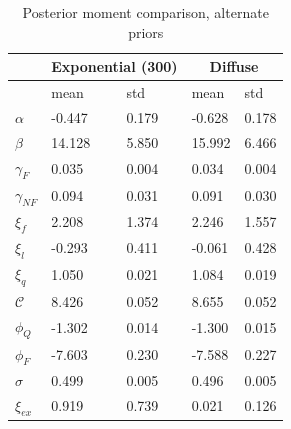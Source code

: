 \documentclass[]{article}
\begin{document}
\begin{table}[h!]
    \centering
    \begin{tabular}{|l|l|l|l|l|}
        \hline 
         & \multicolumn{2}{|c|}{Exponential (300)}        & \multicolumn{2}{|c|}{Diffuse} \\ \hline\hline
                            & mean    & std   & mean       & std    \\ \hline
         $\alpha$             & -0.447 & 0.179 & -0.628 & 0.178 \\ \hline
         $\beta$              & 14.128 & 5.850 & 15.992 & 6.466 \\ \hline
         $\gamma_{F}$         & 0.035  & 0.004 & 0.034  & 0.004 \\ \hline
         $\gamma_{NF}$        & 0.094  & 0.031 & 0.091  & 0.030 \\ \hline
         $\xi_f$              & 2.208  & 1.374 & 2.246  & 1.557 \\ \hline
         $\xi_l$              & -0.293 & 0.411 & -0.061 & 0.428 \\ \hline
         $\xi_q$              & 1.050  & 0.021 & 1.084  & 0.019 \\ \hline
         $\mathcal{C}$        & 8.426  & 0.052 & 8.655  & 0.052 \\ \hline
         $\phi_Q$             & -1.302 & 0.014 & -1.300 & 0.015 \\ \hline
         $\phi_F$             & -7.603 & 0.230 & -7.588 & 0.227 \\ \hline
         $\sigma$             & 0.499  & 0.005 & 0.496  & 0.005 \\ \hline
         $\xi_{ex}$           & 0.919  & 0.739 & 0.021  & 0.126 \\ \hline
    \end{tabular}                              
    \caption{Posterior moment comparison, alternate priors}
    \label{tab:post_comp}
\end{table}

\clearpage 





\
\end{document}
